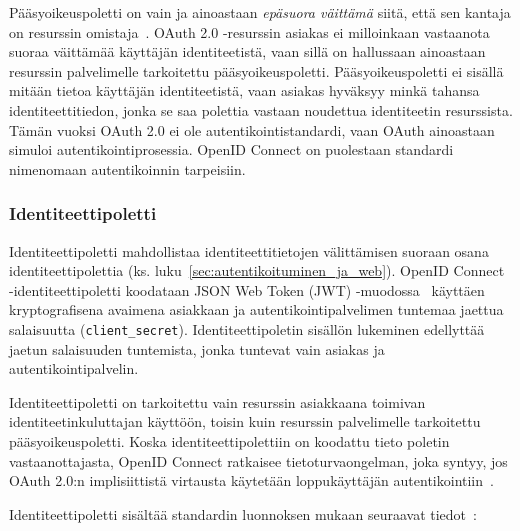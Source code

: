 \documentclass[finnish,gradu]{tktltiki}
\begin{document}
  Pääsyoikeuspoletti on vain ja ainoastaan \emph{epäsuora väittämä} siitä, että sen kantaja on resurssin omistaja~\cite{bradley_oauth_authentication_problem_2012}. OAuth 2.0 -resurssin asiakas ei milloinkaan vastaanota suoraa väittämää käyttäjän identiteetistä, vaan sillä on hallussaan ainoastaan resurssin palvelimelle tarkoitettu pääsyoikeuspoletti. Pääsyoikeuspoletti ei sisällä mitään tietoa käyttäjän identiteetistä, vaan asiakas hyväksyy minkä tahansa identiteettitiedon, jonka se saa polettia vastaan noudettua identiteetin resurssista. Tämän vuoksi OAuth 2.0 ei ole autentikointistandardi, vaan OAuth ainoastaan simuloi autentikointiprosessia. OpenID Connect on puolestaan standardi nimenomaan autentikoinnin tarpeisiin.


  \subsubsection{Identiteettipoletti} %
  \label{ssub:identiteettipoletti}

  Identiteettipoletti mahdollistaa identiteettitietojen välittämisen suoraan osana identiteettipolettia (ks. luku~\ref{sec:autentikoituminen_ja_web}). OpenID Connect -identiteettipoletti koodataan JSON Web Token (JWT) -muodossa~\cite{json_web_token_2011} käyttäen kryptografisena avaimena asiakkaan ja autentikointipalvelimen tuntemaa jaettua salaisuutta (\verb!client_secret!). Identiteettipoletin sisällön lukeminen edellyttää jaetun salaisuuden tuntemista, jonka tuntevat vain asiakas ja autentikointipalvelin.

  Identiteettipoletti on tarkoitettu vain resurssin asiakkaana toimivan identiteetinkuluttajan käyttöön, toisin kuin resurssin palvelimelle tarkoitettu pääsyoikeuspoletti. Koska identiteettipolettiin on koodattu tieto poletin vastaanottajasta, OpenID Connect ratkaisee tietoturvaongelman, joka syntyy, jos OAuth 2.0:n implisiittistä virtausta käytetään loppukäyttäjän autentikointiin~\cite{bradley_oauth_authentication_problem_2012}.

  Identiteettipoletti sisältää standardin luonnoksen mukaan seuraavat tiedot~\cite{sakimura_openid_c_nutshell_2012}:
\end{document}
